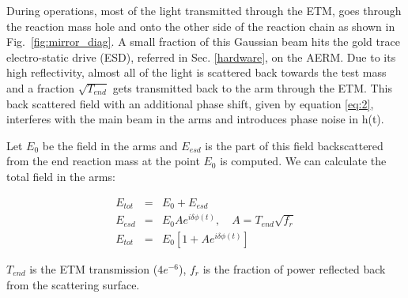 \documentclass[12pt]{iopart}
\begin{document}
\par

During operations, most of the light transmitted through the ETM, goes through the reaction mass hole and onto the other side of the reaction chain as shown in Fig.~\ref{fig:mirror_diag}. A small fraction of this Gaussian beam hits the gold trace electro-static drive (ESD), referred in Sec. \ref{hardware}, on the AERM. Due to its high reflectivity, almost all of the light is scattered back towards the test mass and a fraction $\sqrt{T_{end}}$ gets transmitted back to the arm through the ETM. This back scattered field with an additional phase shift, given by equation \ref{eq:2}, interferes with the main beam in the arms and introduces phase noise in h(t).
\par
Let $E_{0}$ be the field in the arms and $E_{esd}$ is the part of this field backscattered from the end reaction mass at the point $E_{0}$ is computed. We can calculate the total field in the arms:

\begin{eqnarray}
    E_{tot} & = & E_{0} + E_{esd} \label{eq:4} \\
    E_{esd} & = & E_{0}Ae^{i{\delta}{\phi}(t)} ,\quad A = T_{end}\sqrt{f_{r}}  \label{eq:5} \\ 
    E_{tot} & = & E_{0}[1 + Ae^{i{\delta}{\phi}(t)}]  \label{eq:6}
\end{eqnarray}


   

$T_{end}$ is the ETM  transmission ($4e^{-6}$), $f_{r}$ is the fraction of power reflected back from the scattering surface.
\end{document}
